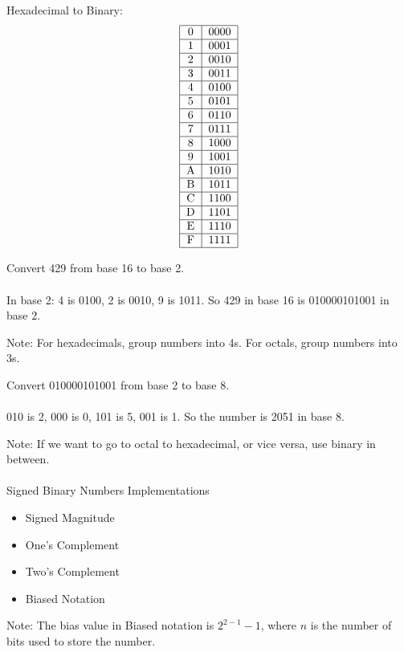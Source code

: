 \documentclass[12pt]{article}
\begin{document}
Hexadecimal to Binary: $$\begin{tabular}{|c|c|} \hline 0 & 0000 \\ \hline 1 & 0001 \\ \hline 2 & 0010 \\ \hline 3 & 0011\\ \hline 4 & 0100\\ \hline 5 & 0101\\ \hline 6 & 0110\\ \hline 7 & 0111\\ \hline 8 & 1000\\ \hline 9 & 1001\\ \hline A & 1010\\ \hline B & 1011\\ \hline C & 1100\\ \hline D & 1101\\ \hline E & 1110\\ \hline F & 1111 \\ \hline
\end{tabular} $$ 
\begin{example} Convert 429 from base 16 to base 2. \\~\\
In base 2: 4 is 0100, 2 is 0010, 9 is 1011. So 429 in base 16 is 010000101001 in base 2. \end{example} 
Note: For hexadecimals, group numbers into 4s. For octals, group numbers into 3s. 
\begin{example} Convert 010000101001 from base 2 to base 8. \\~\\
010 is 2, 000 is 0, 101 is 5, 001 is 1. So the number is 2051 in base 8. \end{example} 
Note: If we want to go to octal to hexadecimal, or vice versa, use binary in between. \\~\\
Signed Binary Numbers Implementations \begin{itemize} 
\item Signed Magnitude \item One's Complement \item Two's Complement \item Biased Notation \end{itemize} 
Note: The bias value in Biased notation is $2^{2 - 1} - 1$, where $n$ is the number of bits used to store the number. \\~\\
\end{document}
